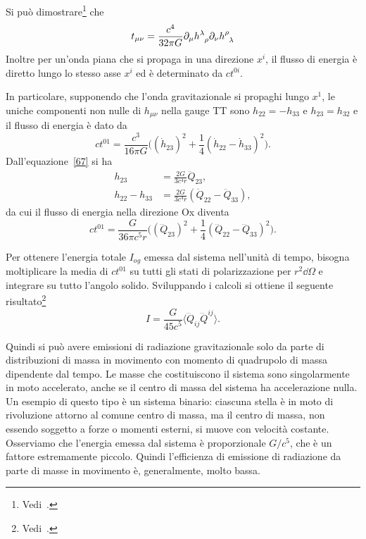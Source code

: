 Si può dimostrare\footnote{Vedi~\textcite[449]{landau:campi}.} che
\begin{equation}
  t_{\mu\nu} = \frac{c^{4}}{32\pi G} \partial_{\mu}
  \tensor{h}{^{\lambda}_{\rho}} \partial_{\nu} \tensor{h}{^{\rho}_{\lambda}}
\end{equation}
Inoltre per un'onda piana che si propaga in una direzione $x^{i}$, il flusso di
energia è diretto lungo lo stesso asse $x^{i}$ ed è determinato da $ct^{0i}$.

In particolare, supponendo che l'onda gravitazionale si propaghi lungo $x^{1}$,
le uniche componenti non nulle di $h_{\mu\nu}$ nella gauge TT sono
$h_{22} = -h_{33}$ e $h_{23} = h_{32}$ e il flusso di energia è dato da
\begin{equation}
  ct^{01} = \frac{c^{3}}{16\pi G}\bigg((\dot{h}_{23})^{2} +
  \frac{1}{4}(\dot{h}_{22} - \dot{h}_{33})^{2}\bigg).
  \label{70}
\end{equation}
Dall'equazione~\eqref{67} si ha
\begin{subequations}
  \begin{align}
    h_{23} &= \frac{2G}{3c^{4}r} \ddot{Q}_{23}, \\
    h_{22} - h_{33} &= \frac{2G}{3c^{4}r}(\ddot{Q}_{22} - \ddot{Q}_{33}),
   \end{align}
\end{subequations}
da cui il flusso di energia nella direzione Ox diventa
\begin{equation}
  ct^{01} = \frac{G}{36\pi c^{5}r}\bigg((\dddot{Q}_{23})^{2} +
  \frac{1}{4}(\dddot{Q}_{22} - \dddot{Q}_{33})^{2}\bigg).
\end{equation}

Per ottenere l'energia totale $I_{og}$ emessa dal sistema nell'unità di tempo,
bisogna moltiplicare la media di $ct^{01}$ su tutti gli stati di polarizzazione
per $r^{2}\dd\Omega$ e integrare su tutto l'angolo solido.  Sviluppando i
calcoli si ottiene il seguente
risultato\footnote{Vedi~\textcite[460-461]{landau:campi}.}
\begin{equation}
  I = \frac{G}{45c^{5}} \langle \dddot{Q}_{ij} \dddot{Q}^{ij}\rangle.
\end{equation}

Quindi si può avere emissioni di radiazione gravitazionale solo da parte di
distribuzioni di massa in movimento con momento di quadrupolo di massa
dipendente dal tempo.  Le masse che costituiscono il sistema sono singolarmente
in moto accelerato, anche se il centro di massa del sistema ha accelerazione
nulla.  Un esempio di questo tipo è un sistema binario: ciascuna stella è in
moto di rivoluzione attorno al comune centro di massa, ma il centro di massa,
non essendo soggetto a forze o momenti esterni, si muove con velocità costante.
Osserviamo che l'energia emessa dal sistema è proporzionale $G/c^{5}$, che è un
fattore estremamente piccolo. Quindi l'efficienza di emissione di radiazione da
parte di masse in movimento è, generalmente, molto bassa.

